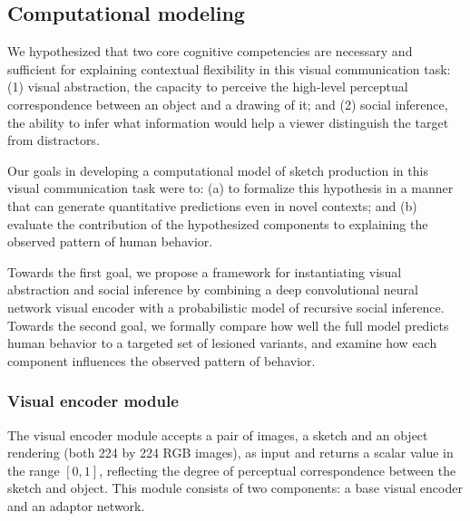 \documentclass[9pt,twocolumn,twoside]{pnas-new}
\newcommand{\mwu}[1]{{\color{green}{[mwu: #1]}}}
\begin{document}
{%

\subsection*{Computational modeling}

We hypothesized that two core cognitive competencies are necessary and sufficient for explaining contextual flexibility in this visual communication task: (1) visual abstraction, the capacity to perceive the high-level perceptual correspondence between an object and a drawing of it; and (2) social inference, the ability to infer what information would help a viewer distinguish the target from distractors.

Our goals in developing a computational model of sketch production in this visual communication task were to: (a) to formalize this hypothesis in a manner that can generate quantitative predictions even in novel contexts; and (b) evaluate the contribution of the hypothesized components to explaining the observed pattern of human behavior.\mwu{i think this is interesting -- why make a computational model? expand more maybe? are we claiming that this is how humans think?}

Towards the first goal, we propose a framework for instantiating visual abstraction and social inference by combining a deep convolutional neural network visual encoder with a probabilistic model of recursive social inference. Towards the second goal, we formally compare how well the full model predicts human behavior to a targeted set of lesioned variants, and examine how each component influences the observed pattern of behavior.  


\subsubsection*{Visual encoder module}

\mwu{this section is a huge brain dump - need more sentences to tie paragraphs together.}

The visual encoder module accepts a pair of images, a sketch and an object rendering (both 224 by 224 RGB images), as input and returns a scalar value in the range $[0,1]$, reflecting the degree of perceptual correspondence between the sketch and object. This module consists of two components: a base visual encoder and an adaptor network.

}
\end{document}

